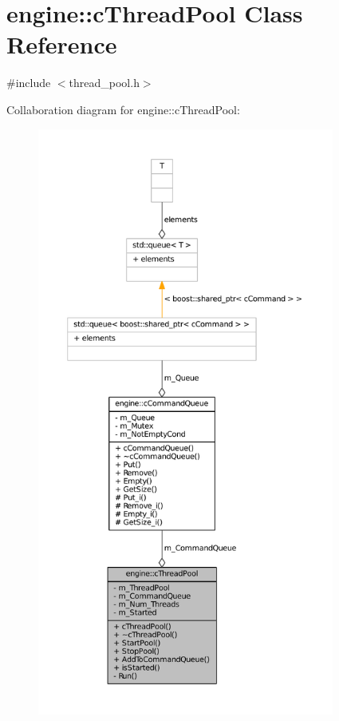 \hypertarget{classengine_1_1cThreadPool}{\section{engine\-:\-:c\-Thread\-Pool \-Class \-Reference}
\label{classengine_1_1cThreadPool}
}


{\ttfamily \#include $<$thread\-\_\-pool.\-h$>$}



\-Collaboration diagram for engine\-:\-:c\-Thread\-Pool\-:
\nopagebreak
\begin{figure}[H]
\begin{center}
\leavevmode
\includegraphics[height=550pt]{classengine_1_1cThreadPool__coll__graph}
\end{center}
\end{figure}
